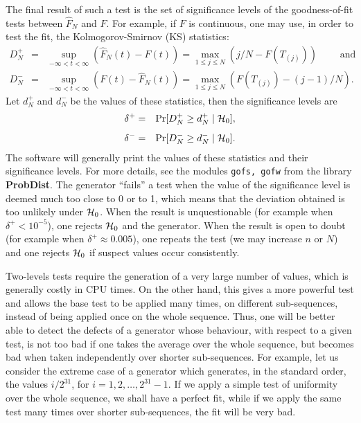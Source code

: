 The final  result of such a test is the set of significance levels
of the goodness-of-fit tests between $\hat F_N$ and $F$.
For example, if $F$ is continuous, one may use, in order to test
the fit, the Kolmogorov-Smirnov (KS)  statistics:
\begin {eqnarray*}
  D_N^+ &=& \sup_{-\infty < t < \infty} \left(\hat F_N(t) - F(t)\right)
         =  \max_{1\le j\le N} \left(j/N - F(T_{(j)})\right)
            \qquad\mbox { and}  \\[6pt]
  D_N^- &=& \sup_{-\infty < t < \infty} \left(F(t) - \hat F_N(t)\right)
         =  \max_{1\le j\le N} \left(F(T_{(j)}) - (j-1)/N\right).
\end {eqnarray*}
Let $d_N^+$ and $d_N^-$ be the values of these statistics,
then  the  significance levels are
\begin {eqnarray*}
  \delta^+ &=& \Pr [D_N^+ \ge d_N^+ \mid \mathcal{H}_0],\\[4pt]
  \delta^- &=& \Pr [D_N^- \ge d_N^- \mid \mathcal{H}_0].
\end {eqnarray*}
The software will generally print the values of these statistics
and their  significance levels.
For more details, see the modules {\tt gofs, gofw} from the
library {\bf ProbDist}.
The generator ``fails'' a test when the value of the significance
level is deemed much too close to 0 or to 1, which means
that the deviation obtained is too unlikely under $\mathcal{H}_0$.
When the result is unquestionable (for example when $\delta^+ < 10^{-5}$),
one rejects $\mathcal{H}_0$ and the generator.
When the result is open to doubt (for example when $\delta^+ \approx 0.005$),
one repeats the test (we may increase $n$ or $N$)
and one rejects $\mathcal{H}_0$ if suspect values occur consistently.

Two-levels tests require the generation of a very large number of
 values, which is generally costly in CPU times. On the other hand,
this gives a more powerful test and allows the base test to be
applied many times, on  different sub-sequences, instead of being
applied once on the whole sequence.  Thus, one will be better able to
detect the defects of a generator whose behaviour,
 with respect to a given test, is not too bad if one takes the average
over the whole sequence, but becomes bad when taken independently
over shorter sub-sequences. 
 For example, let us consider the extreme case of a generator
which generates, in the standard order, the values $i/2^{31}$,
 for $i=1,2,\dots,2^{31}-1$.
If we apply a simple test of uniformity over the whole sequence, we
shall have a perfect fit, while if we apply the same test many times
over shorter sub-sequences, the fit will be very bad.

